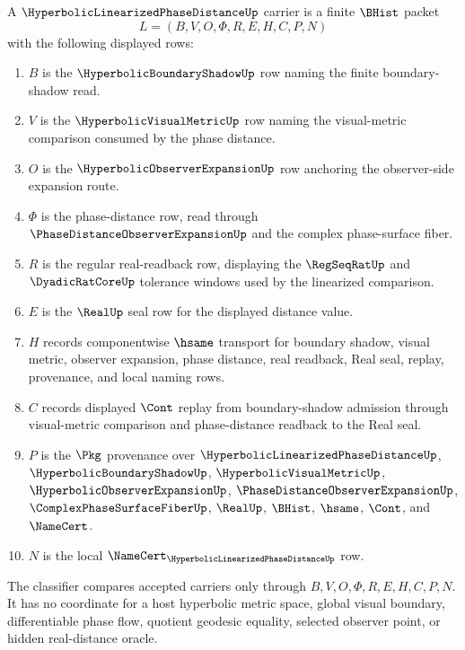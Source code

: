\begin{definition}
\label{def:hyperbolic-linearized-phase-distance-carrier}
A $\HyperbolicLinearizedPhaseDistanceUp$ carrier is a finite $\BHist$ packet
$$
L=(B,V,O,\Phi,R,E,H,C,P,N)
$$
with the following displayed rows:
\begin{enumerate}
\item $B$ is the $\HyperbolicBoundaryShadowUp$ row naming the finite boundary-shadow read.
\item $V$ is the $\HyperbolicVisualMetricUp$ row naming the visual-metric comparison consumed by the phase distance.
\item $O$ is the $\HyperbolicObserverExpansionUp$ row anchoring the observer-side expansion route.
\item $\Phi$ is the phase-distance row, read through $\PhaseDistanceObserverExpansionUp$ and the complex phase-surface fiber.
\item $R$ is the regular real-readback row, displaying the $\RegSeqRatUp$ and $\DyadicRatCoreUp$ tolerance windows used by the linearized comparison.
\item $E$ is the $\RealUp$ seal row for the displayed distance value.
\item $H$ records componentwise $\hsame$ transport for boundary shadow, visual metric, observer expansion, phase distance, real readback, Real seal, replay, provenance, and local naming rows.
\item $C$ records displayed $\Cont$ replay from boundary-shadow admission through visual-metric comparison and phase-distance readback to the Real seal.
\item $P$ is the $\Pkg$ provenance over $\HyperbolicLinearizedPhaseDistanceUp$, $\HyperbolicBoundaryShadowUp$, $\HyperbolicVisualMetricUp$, $\HyperbolicObserverExpansionUp$, $\PhaseDistanceObserverExpansionUp$, $\ComplexPhaseSurfaceFiberUp$, $\RealUp$, $\BHist$, $\hsame$, $\Cont$, and $\NameCert$.
\item $N$ is the local $\NameCert_{\HyperbolicLinearizedPhaseDistanceUp}$ row.
\end{enumerate}
The classifier compares accepted carriers only through $B,V,O,\Phi,R,E,H,C,P,N$. It has no coordinate for a host hyperbolic metric space, global visual boundary, differentiable phase flow, quotient geodesic equality, selected observer point, or hidden real-distance oracle.
\end{definition}

